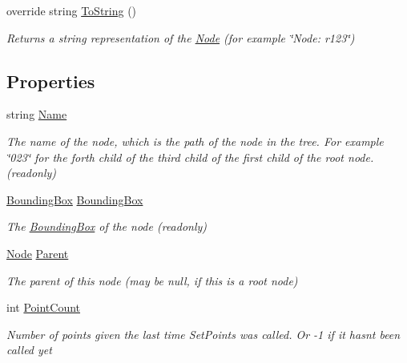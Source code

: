 \begin{DoxyCompactItemize}
override string \hyperlink{class_cloud_data_1_1_node_af070c6770edc822d95393383c70aa055}{To\+String} ()
\begin{DoxyCompactList}\small\item\em Returns a string representation of the \hyperlink{class_cloud_data_1_1_node}{Node} (for example \char`\"{}\+Node\+: r123\char`\"{}) \end{DoxyCompactList}\end{DoxyCompactItemize}
\subsection*{Properties}
\begin{DoxyCompactItemize}
\item 
string \hyperlink{class_cloud_data_1_1_node_ad6676243e485f19675af4055c164071b}{Name}
\begin{DoxyCompactList}\small\item\em The name of the node, which is the path of the node in the tree. For example \char`\"{}023\char`\"{} for the forth child of the third child of the first child of the root node. (readonly) \end{DoxyCompactList}\item 
\hyperlink{class_cloud_data_1_1_bounding_box}{Bounding\+Box} \hyperlink{class_cloud_data_1_1_node_ad82330bd7fb62f8c25512d2f3ecd7888}{Bounding\+Box}
\begin{DoxyCompactList}\small\item\em The \hyperlink{class_cloud_data_1_1_bounding_box}{Bounding\+Box} of the node (readonly) \end{DoxyCompactList}\item 
\hyperlink{class_cloud_data_1_1_node}{Node} \hyperlink{class_cloud_data_1_1_node_ae7600b8769acc09e7d3a6d4a5382fed8}{Parent}
\begin{DoxyCompactList}\small\item\em The parent of this node (may be null, if this is a root node) \end{DoxyCompactList}\item 
int \hyperlink{class_cloud_data_1_1_node_a5d9df7ed9ea8c45472d032591e7ea99c}{Point\+Count}
\begin{DoxyCompactList}\small\item\em Number of points given the last time Set\+Points was called. Or -\/1 if it hasn\textquotesingle{}t been called yet \end{DoxyCompactList}\item 

\end{DoxyCompactItemize}
